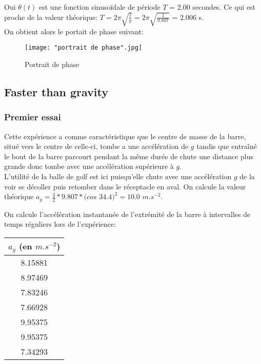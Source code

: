 \documentclass{scrartcl}
\begin{document}
			\noindent Oui $\theta(t)$ est une fonction sinusoïdale de période $T$ = 2.00 secondes. Ce qui est proche de la valeur théorique: $T = 2\pi\sqrt{\frac{l}{g}} = 2\pi\sqrt{\frac{1}{9.807}}$ = 2.006 s.\\
			On obtient alors le portait de phase suivant:
			
			\begin{figure}[ht!]
				\centering
				\texttt{[image: "portrait de phase".jpg]}
				\caption{Portrait de phase}
			\end{figure}
			
		\subsection{Faster than gravity}
		
			\subsubsection{Premier essai}
			
				Cette expérience a comme caractéristique que le centre de masse de la barre, situé vers le centre de celle-ci, tombe a une accélération de $g$ tandis que entraîné le bout de la barre parcourt pendant la même durée de chute une distance plus grande donc tombe avec une accélération supérieure à $g$.\\
				L'utilité de la balle de golf est ici puisqu'elle chute avec une accélération $g$ de la voir se décoller puis retomber dans le réceptacle en aval.
				On calcule la valeur théorique $a_y = \frac{3}{2} * 9.807 * (cos$ $34.4)^2 = 10.0$ $m.s^{-2}$.
				
				\noindent On calcule l'accélération instantanée de l'extrémité de la barre à intervalles de temps réguliers lors de l'expérience:
				
				\noindent \begin{tabular}{|c|}
					\hline $a_y$ (en $m.s^{-2}$) \\
					\hline 8.15881\\
					\hline 8.97469\\
					\hline 7.83246\\
					\hline 7.66928\\
					\hline 9.95375\\
					\hline 9.95375\\
					\hline 7.34293\\
					\hline
				\end{tabular}\\
			
\end{document}
